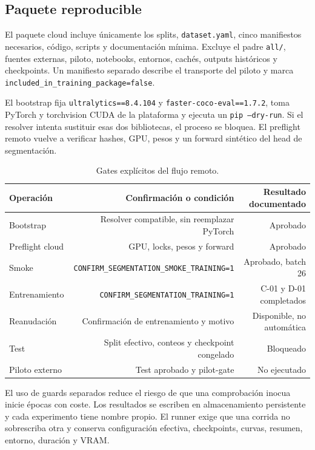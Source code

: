 \documentclass[11pt,a4paper]{article}
\begin{document}
\subsection{Paquete reproducible}

El paquete cloud incluye únicamente los splits, \texttt{dataset.yaml}, cinco manifiestos necesarios, código, scripts y documentación mínima. Excluye el padre \texttt{all/}, fuentes externas, piloto, notebooks, entornos, cachés, outputs históricos y checkpoints. Un manifiesto separado describe el transporte del piloto y marca \texttt{included\_in\_training\_package=false}.


El bootstrap fija \texttt{ultralytics==8.4.104} y \texttt{faster-coco-eval==1.7.2}, toma PyTorch y torchvision CUDA de la plataforma y ejecuta un \texttt{pip --dry-run}. Si el resolver intenta sustituir esas dos bibliotecas, el proceso se bloquea. El preflight remoto vuelve a verificar hashes, GPU, pesos y un forward sintético del head de segmentación.


\begin{table}[H]
\centering
\caption{Gates explícitos del flujo remoto.}
\small
\begin{tabular}{lrr}
\toprule
Operación & Confirmación o condición & Resultado documentado \\
\midrule
Bootstrap & Resolver compatible, sin reemplazar PyTorch & Aprobado \\
Preflight cloud & GPU, locks, pesos y forward & Aprobado \\
Smoke & \texttt{CONFIRM\_SEGMENTATION\_SMOKE\_TRAINING=1} & Aprobado, batch 26 \\
Entrenamiento & \texttt{CONFIRM\_SEGMENTATION\_TRAINING=1} & C-01 y D-01 completados \\
Reanudación & Confirmación de entrenamiento y motivo & Disponible, no automática \\
Test & Split efectivo, conteos y checkpoint congelado & Bloqueado \\
Piloto externo & Test aprobado y pilot-gate & No ejecutado \\
\bottomrule
\end{tabular}
\end{table}

El uso de guards separados reduce el riesgo de que una comprobación inocua inicie épocas con coste. Los resultados se escriben en almacenamiento persistente y cada experimento tiene nombre propio. El runner exige que una corrida no sobrescriba otra y conserva configuración efectiva, checkpoints, curvas, resumen, entorno, duración y VRAM.
\end{document}
